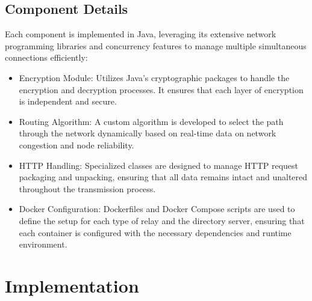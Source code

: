 \documentclass[sigconf]{acmart}
\begin{document}

\subsection{Component Details}
Each component is implemented in Java, leveraging its extensive network programming libraries and concurrency features to manage multiple simultaneous connections efficiently:

\begin{itemize}
    \item Encryption Module: Utilizes Java's cryptographic packages to handle the encryption and decryption processes. It ensures that each layer of encryption is independent and secure.
    \item Routing Algorithm: A custom algorithm is developed to select the path through the network dynamically based on real-time data on network congestion and node reliability.
    \item HTTP Handling: Specialized classes are designed to manage HTTP request packaging and unpacking, ensuring that all data remains intact and unaltered throughout the transmission process.
    \item Docker Configuration: Dockerfiles and Docker Compose scripts are used to define the setup for each type of relay and the directory server, ensuring that each container is configured with the necessary dependencies and runtime environment.
\end{itemize}


\section{Implementation}
\end{document}
